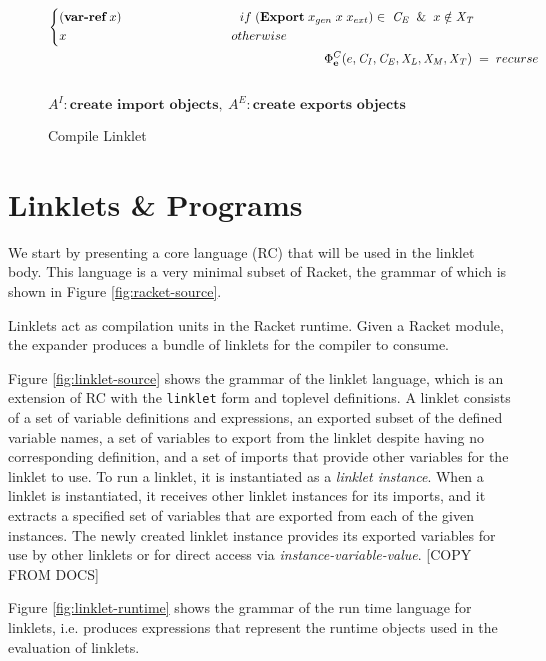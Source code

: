 \documentclass[sigplan,screen,anonymous]{acmart}
\def\dash {\text{-}}
\begin{document}
\begin{figure*}[tbp]
\begin{align*}
\begin{cases*}
      (\textbf{var\dash ref}\; x) \hspace{3.3cm} if\; (\textbf{Export}\; x_{gen}\; x\; x_{ext}) \in\;\mathit{C_E}\;\; \&\;\; x\notin \mathit{X_T} \\
      x \hspace{4.6cm} otherwise
    \end{cases*} \\
    \Phi^C_{\textbf{e}}(e,\mathit{C_I}, \mathit{C_E}, \mathit{X_L},\mathit{X_M},\mathit{X_T})\; &=\; recurse \\
  \end{align*} \\
  \hfill \footnotesize $\mathit{A}^I : \textbf{create import objects},\: \mathit{A}^E : \textbf{create exports objects}$
\caption{Compile Linklet}
\label{fig:compile}
\end{figure*}



\section{Linklets \& Programs}

We start by presenting a core language (RC) that will be used in the
linklet body. This language is a very minimal subset of Racket, the
grammar of which is shown in Figure \ref{fig:racket-source}.

Linklets act as compilation units in the Racket runtime. Given a
Racket module, the expander produces a bundle of linklets for the
compiler to consume.

Figure \ref{fig:linklet-source} shows the grammar of the linklet
language, which is an extension of RC with the \verb|linklet| form and
toplevel definitions. A linklet consists of a set of variable
definitions and expressions, an exported subset of the defined
variable names, a set of variables to export from the linklet despite
having no corresponding definition, and a set of imports that provide
other variables for the linklet to use. To run a linklet, it is
instantiated as a {\it linklet instance}. When a linklet is
instantiated, it receives other linklet instances for its imports, and
it extracts a specified set of variables that are exported from each
of the given instances. The newly created linklet instance provides
its exported variables for use by other linklets or for direct access
via {\it instance-variable-value}. [COPY FROM DOCS]

Figure \ref{fig:linklet-runtime} shows the grammar of the run\dash
time language for linklets, i.e. produces expressions that represent
the run\dash time objects used in the evaluation of linklets.
\end{document}
